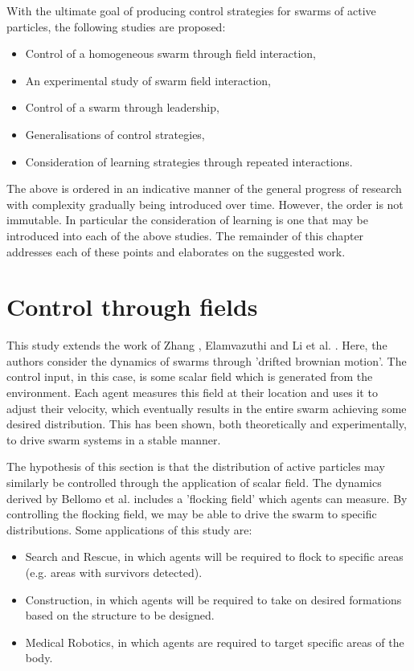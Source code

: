 \documentclass[../sample.tex]{subfiles}
\begin{document}
	With the ultimate goal of producing control strategies for swarms of active particles, the
	following studies are proposed:

	\begin{itemize}
		\item Control of a homogeneous swarm through field interaction,
		\item An experimental study of swarm field interaction,
		\item Control of a swarm through leadership,
		\item Generalisations of control strategies,
		\item Consideration of learning strategies through repeated interactions.
	\end{itemize}

	The above is ordered in an indicative manner of the general progress of research with
	complexity gradually being introduced over time. However, the order is not immutable. In
	particular the consideration of learning is one that may be introduced into each of the above
	studies. The remainder of this chapter addresses each of these points and elaborates on the
	suggested work.

	\section{Control through fields} %
	\label{sub:control_through_fields}
	
	This study extends the work of Zhang \cite{Zhang2018}, Elamvazuthi \cite{Elamvazhuthi2019} and
	Li et al. \cite{Li2017}. Here, the authors consider the dynamics of swarms through 'drifted
	brownian motion'. The control input, in this case, is some scalar field which is generated from the
	environment. Each agent measures this field at their location and uses it to adjust their
	velocity, which eventually results in the entire swarm achieving some desired distribution. This
	has been shown, both theoretically and experimentally, to drive swarm systems in a stable
	manner.

	The hypothesis of this section is that the distribution of active particles may
	similarly be controlled through the application of scalar field. The dynamics derived by Bellomo
	et al. \cite{Bellomo2017} includes a 'flocking field' which agents can measure. By controlling
	the flocking field, we may be able to drive the swarm to specific
	distributions. Some applications of this study are:

	\begin{itemize}
		\item Search and Rescue, in which agents will be required to flock to specific areas (e.g.
		areas with survivors detected).
		\item Construction, in which agents will be required to take on desired formations based on
		the structure to be designed.
		\item Medical Robotics, in which agents are required to target specific areas of the body.
	\end{itemize}
\end{document}

